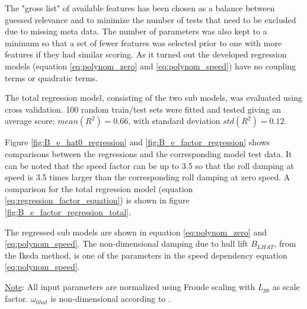 The "gross list" of available features has been chosen as a balance between guessed relevance and to minimize the number of tests that need to be excluded due to missing meta data. 
The number of parameters was also kept to a minimum so that a set of fewer features was selected prior to one with more features if they had similar scoring. As it turned out the developed regression models (equation \ref{eq:polynom_zero} and \ref{eq:polynom_speed}) have no coupling terms or quadratic terms.

The total regression model, consisting of the two sub models, was evaluated using cross validation. 100 random train/test sets were fitted and tested giving an average score: $mean(R^2)=0.66$, with standard deviation $std(R^2)=0.12$.

Figure \ref{fig:B_e_hat0_regression} and \ref{fig:B_e_factor_regression} shows comparisons between the regressions and the corresponding model test data. It can be noted that the speed factor can be up to 3.5 so that the roll damping at speed is 3.5 times larger than the corresponding roll damping at zero speed. A comparison for the total regression model (equation \ref{eq:regression_factor_equation}) is shown in figure \ref{fig:B_e_factor_regression_total}.

 The regressed sub models are shown in equation \ref{eq:polynom_zero} and \ref{eq:polynom_speed}. The non-dimensional damping due to hull lift $B_{LHAT}$, from the Ikeda method, is one of the parameters in the speed dependency equation \ref{eq:polynom_speed}.



{\footnotesize \underline{Note}: All input parameters are normalized using Froude scaling with $L_{pp}$ as scale factor. $\omega_{0hat}$ is non-dimensional according to \parencite{himeno_prediction_1981}.} 

